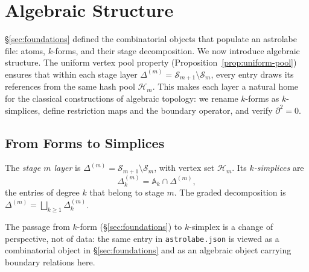\section{Algebraic Structure}
\label{sec:topology}

\S\ref{sec:foundations} defined the combinatorial objects that populate an astrolabe file: atoms, $k$-forms, and their stage decomposition. We now introduce algebraic structure. The uniform vertex pool property (Proposition~\ref{prop:uniform-pool}) ensures that within each stage layer $\Delta^{(m)} = \mathcal{S}_{m+1} \setminus \mathcal{S}_m$, every entry draws its references from the same hash pool $\mathcal{H}_m$. This makes each layer a natural home for the classical constructions of algebraic topology: we rename $k$-forms as $k$-simplices, define restriction maps and the boundary operator, and verify $\partial^2 = 0$.


\subsection{From Forms to Simplices}

\begin{definition}
\label{def:stage-layer}
The \emph{stage $m$ layer} is $\Delta^{(m)} = \mathcal{S}_{m+1} \setminus \mathcal{S}_m$, with vertex set $\mathcal{H}_m$. Its \emph{$k$-simplices} are
\[
\Delta^{(m)}_k = \mathbb{A}_k \cap \Delta^{(m)},
\]
the entries of degree $k$ that belong to stage $m$. The graded decomposition is $\Delta^{(m)} = \bigsqcup_{k \geq 1} \Delta^{(m)}_k$.
\end{definition}

The passage from $k$-form (\S\ref{sec:foundations}) to $k$-simplex is a change of perspective, not of data: the same entry in \texttt{astrolabe.json} is viewed as a combinatorial object in \S\ref{sec:foundations} and as an algebraic object carrying boundary relations here.

